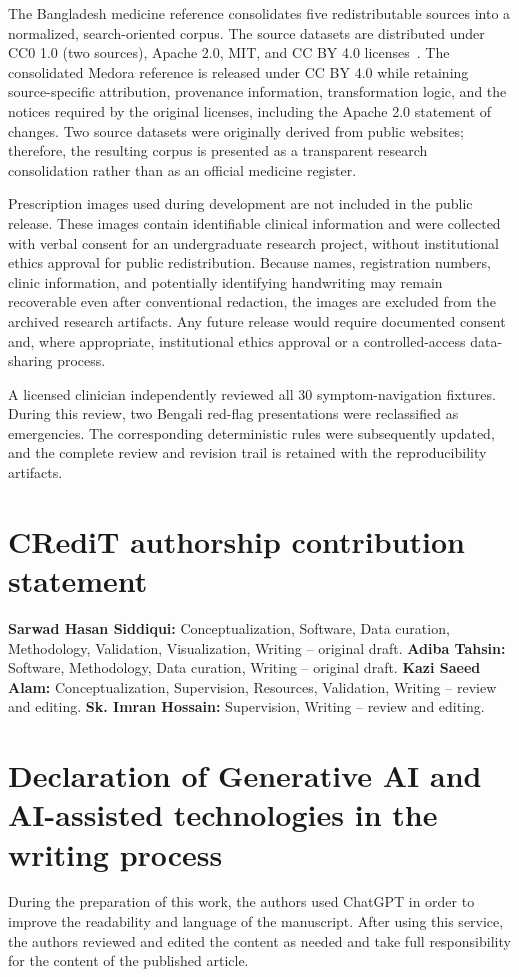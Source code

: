 \documentclass[preprint,12pt,a4paper]{elsarticle}
\begin{document}
The Bangladesh medicine reference consolidates five redistributable sources into
a normalized, search-oriented corpus. The source datasets are distributed under
CC0 1.0 (two sources), Apache 2.0, MIT, and CC BY 4.0 licenses~\cite{bdmeds}.
The consolidated Medora reference is released under CC BY 4.0 while retaining
source-specific attribution, provenance information, transformation logic, and
the notices required by the original licenses, including the Apache 2.0 statement
of changes. Two source datasets were originally derived from public websites;
therefore, the resulting corpus is presented as a transparent research
consolidation rather than as an official medicine register.

Prescription images used during development are not included in the public
release. These images contain identifiable clinical information and were
collected with verbal consent for an undergraduate research project, without
institutional ethics approval for public redistribution. Because names,
registration numbers, clinic information, and potentially identifying handwriting
may remain recoverable even after conventional redaction, the images are excluded
from the archived research artifacts. Any future release would require documented
consent and, where appropriate, institutional ethics approval or a controlled-access
data-sharing process.

A licensed clinician independently reviewed all 30 symptom-navigation fixtures.
During this review, two Bengali red-flag presentations were reclassified as
emergencies. The corresponding deterministic rules were subsequently updated, and
the complete review and revision trail is retained with the reproducibility
artifacts.

\section*{CRediT authorship contribution statement}
\textbf{Sarwad Hasan Siddiqui:} Conceptualization,  Software, Data curation, Methodology, Validation, Visualization, Writing -- original draft. \textbf{Adiba Tahsin:} Software, Methodology, Data curation, Writing -- original draft. \textbf{Kazi Saeed Alam:} Conceptualization, Supervision, Resources, Validation, Writing -- review and editing. \textbf{Sk. Imran Hossain:} Supervision, Writing -- review and editing.

\section*{Declaration of Generative AI and AI-assisted technologies in the writing process}
During the preparation of this work, the authors used ChatGPT in order to improve the readability and language of the manuscript. After using this service, the authors reviewed and edited the content as needed and take full responsibility for the content of the published article.
\end{document}
